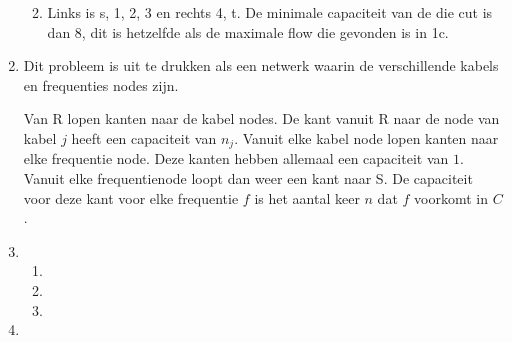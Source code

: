 \documentclass[11pt]{article}
\begin{document}
\begin{enumerate}
\begin{enumerate}


            \item
                Links is s, 1, 2, 3 en rechts 4, t. De minimale capaciteit van
                de die cut is dan 8, dit is hetzelfde als de maximale flow die
                gevonden is in 1c.

        \end{enumerate}

    \item
        Dit probleem is uit te drukken als een netwerk waarin de verschillende kabels
        en frequenties nodes zijn.

        Van R lopen kanten naar de kabel nodes. De kant vanuit R naar de node
        van kabel $j$ heeft een capaciteit van $n_j$. Vanuit elke kabel node
        lopen kanten naar elke frequentie node. Deze kanten hebben allemaal een
        capaciteit van $1$. Vanuit elke frequentienode loopt dan weer een kant
        naar S. De capaciteit voor deze kant voor elke frequentie $f$ is het
        aantal keer $n$ dat $f$ voorkomt in $C$.


    \item
        \begin{enumerate}
            \item

            \item

            \item

        \end{enumerate}

    \item

\end{enumerate}
\end{document}

